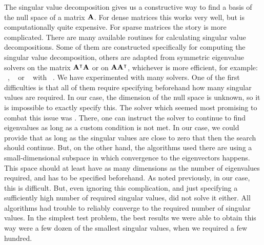 The singular value decomposition gives us a constructive way to find a basis of the null space of a matrix $\vb{A}$. For dense matrices this works very well, but is computationally quite expensive. For sparse matrices the story is more complicated. There are many available routines for calculating singular value decompositions. Some of them are constructed specifically for computing the singular value decomposition, others are adapted from symmetric eigenvalue solvers on the matrix ${\vb{A}}^\intercal\vb{A}$ or on $\vb{A}{\vb{A}}^\intercal$, whichever is more efficient, for example: \slepc{}~\cite{hernandez_slepc_2005}, \spectra{}~\cite{qiu_spectra_2022} or \scipy{}~\cite{virtanen_scipy_2020} with \arpack{}~\cite{lehoucq_arpack_1998}. We have experimented with many solvers. One of the first difficulties is that all of them require specifying beforehand how many singular values are required. In our case, the dimension of the null space is unknown, so it is impossible to exactly specify this. The solver which seemed most promising to combat this issue was \slepc{}. There, one can instruct the solver to continue to find eigenvalues as long as a custom condition is not met. In our case, we could provide that as long as the singular values are close to zero that then the search should continue. But, on the other hand, the algorithms used there are using a small-dimensional subspace in which convergence to the eigenvectors happens. This space should at least have as many dimensions as the number of eigenvalues required, and has to be specified beforehand. As noted previously, in our case, this is difficult. But, even ignoring this complication, and just specifying a sufficiently high number of required singular values, did not solve it either. All algorithms had trouble to reliably converge to the required number of singular values. In the simplest test problem, the best results we were able to obtain this way were a few dozen of the smallest singular values, when we required a few hundred.

